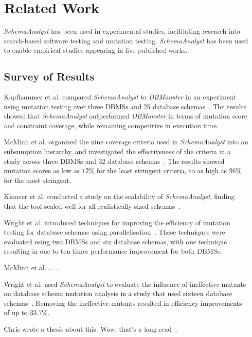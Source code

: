 \section{Related Work}\label{sec:relatedwork}
\textit{SchemaAnalyst} has been used in experimental studies, facilitating research into
search-based software testing and mutation testing.  \textit{SchemaAnalyst} has been used to enable
empirical studies appearing in five published works. 
\subsection{Survey of Results}

Kapfhammer et al. compared \textit{SchemaAnalyst} to \textit{DBMonster}
in an experiment using mutation testing over three DBMSs and 25 database 
schemas~\cite{kapfhammer2013search}. The results showed that \textit{SchemaAnalyst} outperformed
\textit{DBMonster} in terms of mutation score and constraint coverage, while remaining competitive
in execution time.

McMinn et al. organized the nine coverage criteria used in \textit{SchemaAnalyst} into an subsumption
hierarchy, and investigated the effectiveness of the criteria in a study across
three DBMSs and 32 database schemas~\cite{mcminn2015effectiveness}.  The results showed mutation
scores as low as $12\%$ for the least stringent criteria, to as high as $96\%$ for the most stringent.

Kinneer et al. conducted a study on the scalability of \textit{SchemaAnalyst}, finding that the tool
scaled well for all realistically sized schemas~\cite{kinneer2015automatically}.

Wright et al. introduced techniques for improving the efficiency of mutation testing for database
schemas using parallelisation~\cite{wright2013efficient}. These techniques were evaluated using two
DBMSs and six database schemas, with one technique resulting in one to ten times performance
improvement for both DBMSs.

McMinn et al. \dots~\cite{mcminn2016virtual}.

Wright et al. used \textit{SchemaAnalyst} to evaluate the influence of ineffective mutants on
database schema mutation analysis in a study that used sixteen database
schemas~\cite{wright2014impact}. Removing the ineffective mutants resulted in efficiency
improvements of up to $33.7\%$.

Chris wrote a thesis about this. Wow, that's a long read~\cite{wright2015mutation}.

